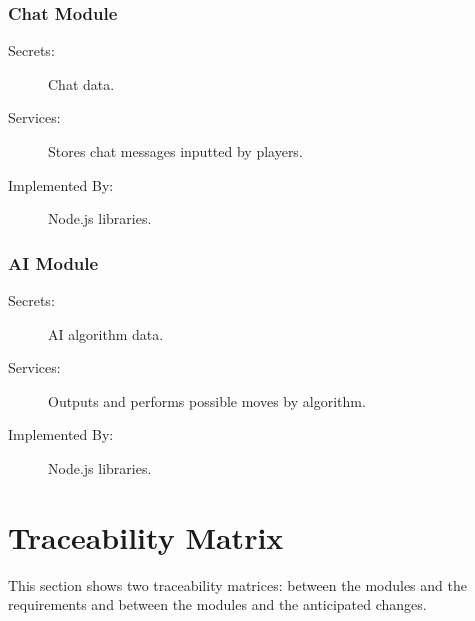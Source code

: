 \documentclass[12pt, titlepage]{article}
\begin{document}
    \subsubsection{Chat Module \label{mChat}}
    \begin{description}
    \item[Secrets:] Chat data.
    \item[Services:] Stores chat messages inputted by players.
    \item[Implemented By:] Node.js libraries.
    \end{description}
    
    \subsubsection{AI Module \label{mAI}}
    \begin{description}
    \item[Secrets:] AI algorithm data.
    \item[Services:] Outputs and performs possible moves by algorithm.
    \item[Implemented By:] Node.js libraries.
    \end{description}
\section{Traceability Matrix} \label{SecTM}

This section shows two traceability matrices: between the modules and the
requirements and between the modules and the anticipated changes.

\end{document}
